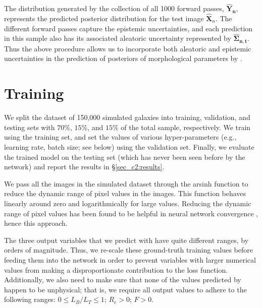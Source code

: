 The distribution generated by the collection of all 1000 forward passes, $\boldsymbol{\hat{Y}_{n}}$,
represents the predicted posterior distribution for the test image $\boldsymbol{\hat{X}}_n$. The different forward passes capture the epistemic uncertainties, and each prediction in this sample also has its associated aleatoric uncertainty represented by $\boldsymbol{\hat{\Sigma}_{n,t}}$. Thus the above procedure allows us to incorporate both aleatoric and epistemic uncertainties in the prediction of posteriors of morphological parameters by \gampen{}.

\section{Training \gampen } \label{sec_c2:training}
We split the dataset of 150,000 simulated galaxies into training, validation, and testing sets with $70\%$, $15\%$, and $15\%$ of the total sample, respectively. We train \gampen{} using the training set, and set the values of various hyper-parameters (e.g., learning rate, batch size; see below) using the validation set. Finally, we evaluate the trained model on the testing set (which has never been seen before by the network) and report the results in \S \ref{sec_c2:results}.

We pass all the images in the simulated dataset through the arsinh function to reduce the dynamic range of pixel values in the images. This function behaves linearly around zero and logarithmically for large values. Reducing the dynamic range of pixel values has been found to be helpful in neural network convergence \citep[e.g.,][]{zanisi_21,walmsley_decals,tanaka_22}, hence this approach. 

The three output variables that we predict with \gampen{} have quite different ranges, by orders of magnitude. Thus, we re-scale these ground-truth training values before feeding them into the network in order to prevent variables with larger numerical values from making a disproportionate contribution to the loss function. Additionally, we also need to make sure that none of the values predicted by \gampen{} happen to be unphysical; that is, we require all output values to adhere to the following ranges: $0 \leq L_B/L_T \leq 1$; $R_e > 0$; $F > 0$. 

